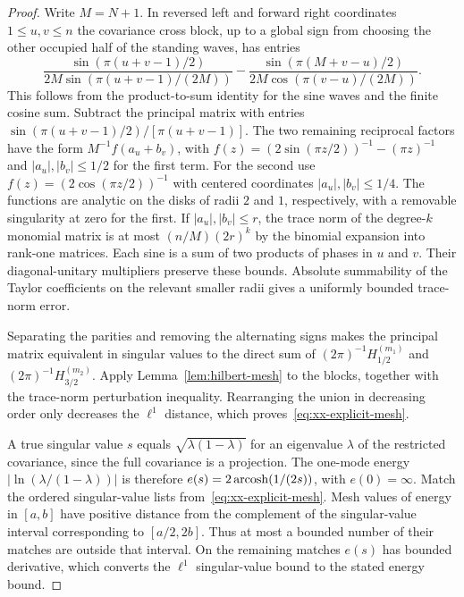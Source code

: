 \begin{proof}
Write $M=N+1$. In reversed left and forward right coordinates
$1\le u,v\le n$ the covariance cross block, up to a global sign
from choosing the other occupied half of the standing waves, has
entries
\[
\frac{\sin(\pi (u+v-1)/2)}{2M\sin(\pi(u+v-1)/(2M))}
-\frac{\sin(\pi(M+v-u)/2)}{2M\cos(\pi(v-u)/(2M))}.
\]
This follows from the product-to-sum identity for the sine waves
and the finite cosine sum. Subtract the principal matrix with
entries $\sin(\pi(u+v-1)/2)/[\pi(u+v-1)]$. The two remaining
reciprocal factors have the form $M^{-1}f(a_u+b_v)$, with
$f(z)=(2\sin(\pi z/2))^{-1}-(\pi z)^{-1}$ and
$|a_u|,|b_v|\le1/2$ for the first term. For the second use
$f(z)=(2\cos(\pi z/2))^{-1}$ with centered coordinates
$|a_u|,|b_v|\le1/4$. The functions are analytic on the disks
of radii $2$ and $1$, respectively, with a removable singularity
at zero for the first. If $|a_u|,|b_v|\le r$, the trace norm
of the degree-$k$ monomial matrix is at most $(n/M)(2r)^k$
by the binomial expansion into rank-one matrices. Each sine is a
sum of two products of phases in $u$ and $v$. Their diagonal-unitary
multipliers preserve these bounds. Absolute summability of the
Taylor coefficients on the relevant smaller radii gives a uniformly
bounded trace-norm error.

Separating the parities and removing the alternating signs makes
the principal matrix equivalent in singular values to the direct
sum of $(2\pi)^{-1}H_{1/2}^{(m_1)}$ and $(2\pi)^{-1}H_{3/2}^{(m_2)}$.
Apply Lemma~\ref{lem:hilbert-mesh} to the
blocks, together with the trace-norm perturbation inequality.
Rearranging the union in decreasing order only decreases the
$\ell^1$ distance, which proves~\eqref{eq:xx-explicit-mesh}.

A true singular value $s$ equals $\sqrt{\lambda(1-\lambda)}$
for an eigenvalue $\lambda$ of the restricted covariance, since
the full covariance is a projection. The one-mode energy
$|\ln(\lambda/(1-\lambda))|$ is therefore
$e(s)=2\operatorname{arcosh}(1/(2s))$, with $e(0)=\infty$.
Match the ordered singular-value lists from~\eqref{eq:xx-explicit-mesh}. Mesh values of
energy in $[a,b]$ have positive distance from the complement
of the singular-value interval corresponding to $[a/2,2b]$.
Thus at most a bounded number of their matches are outside that
interval. On the remaining matches $e(s)$ has bounded derivative,
which converts the $\ell^1$ singular-value bound to the stated
energy bound.
\end{proof}


